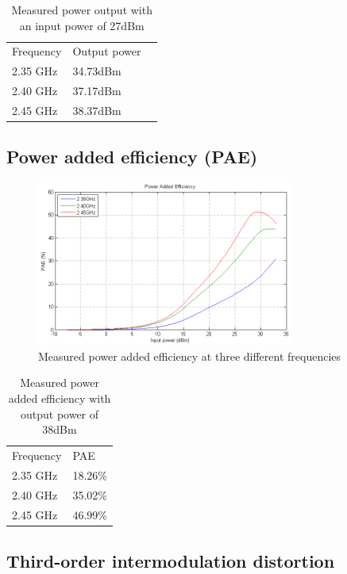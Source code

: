   \begin{table}[H]
	  \centering
	  \begin{tabular}{l l l}
		  Frequency & Output power\\
		  2.35 GHz & 34.73dBm \\
		  2.40 GHz & 37.17dBm \\
		  2.45 GHz & 38.37dBm
	  \end{tabular}
	  \caption{Measured power output with an input power of 27dBm}
	  \label{tab:Meas_Pout}
  \end{table}

  \subsection{Power added efficiency (PAE)}

  \begin{figure}[H]
	  \centering
	  \includegraphics[width=0.75\textwidth]{img/Power_Added_Efficiency}
	  \caption{Measured power added efficiency at three different frequencies}
	  \label{fig:Meas_Pae}
  \end{figure}

  \begin{table}[H]
	  \centering
	  \begin{tabular}{l l}
		  Frequency & PAE \\
		  2.35 GHz & 18.26\% \\
		  2.40 GHz & 35.02\% \\
		  2.45 GHz & 46.99\%
	  \end{tabular}
	  \caption{Measured power added efficiency with output power of 38dBm}
	  \label{tab:Meas_Pae}
  \end{table}

  \subsection{Third-order intermodulation distortion}

